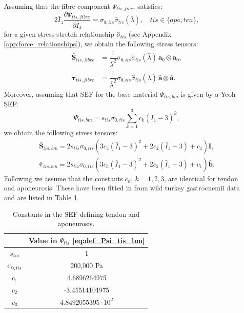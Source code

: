 \documentclass{sfuthesis}
\numberwithin{equation}{section}
\numberwithin{figure}{chapter}
\numberwithin{table}{chapter}
\theoremstyle{definition}
\def\*#1{{\mathbf{#1}}} %
\newcommand{\pder}[2]{\dfrac{\partial #1}{\partial #2}}
\newcommand{\I}{{\bar{I}}}
\def\btau{{\bm{\tau}}}
\begin{document}
Assuming that the fibre component $\Psi_{tis,fibre}$ satisfies:
\begin{equation}
    2 \I_4 \pder{\Psi_{tis,fibre}}{\I_4} = \sigma_{0,tis} \widehat{\sigma}_{tis}(\bar{\lambda}), \quad tis \in \{apo,ten\},
\end{equation}
for a given stress-stretch relationship $\widehat{\sigma}_{tis}$ (see Appendix \ref{app:force_relationships}), we obtain the following stress tensors:
\begin{align}
    \bar{\*S}_{tis,fibre} &= \dfrac{1}{\bar{\lambda}^2} \sigma_{0,tis} \widehat{\sigma}_{tis}(\bar{\lambda}) \, \*a_0 \otimes \*a_0, \\
    \bar{\btau}_{tis,fibre} &= \dfrac{1}{\bar{\lambda}^2} \sigma_{0,tis} \widehat{\sigma}_{tis}(\bar{\lambda}) \, \bar{\*a} \otimes \bar{\*a}.
\end{align}
Moreover, assuming that SEF for the base material $\Psi_{tis,bm}$ is given by a Yeoh SEF:
\begin{equation} \label{eq:def_Psi_tis_bm}
    \Psi_{tis,bm} = s_{tis} \sigma_{0,tis} \sum_{k=1}^3 c_k (\I_1 - 3)^k,
\end{equation}
we obtain the following stress tensors:
\begin{align}
    \bar{\*S}_{tis, bm} = 2 s_{tis} \sigma_{0,tis}  \left( 3c_3(\I_1-3)^2 + 2c_2 (\I_1-3) + c_1 \right) \*I, \\
    \bar{\btau}_{tis,bm} = 2 s_{tis} \sigma_{0,tis}  \left( 3c_3(\I_1-3)^2 + 2c_2 (\I_1-3) + c_1 \right) \bar{\*b}.
\end{align}
Following \cite{Seba} we assume that the constants $c_k$, $k=1,2,3$, are identical for tendon and aponeurosis. These have been fitted in \cite{Seba} from wild turkey gastrocnemii data \cite{Azizi2009} and are listed in Table \ref{tab:constants_ten_apo}.

\begin{table}
    \centering
    \begin{tabular}{|c|c|}\hline
        & Value in $\Psi_{tis}$ \eqref{eq:def_Psi_tis_bm} \\\hline
        $s_{tis}$ & 1 \\\hline
        $\sigma_{0,tis}$ & 200,000 \si{Pa} \\\hline
        $c_1$ & 4.6896264975 \\\hline
        $c_2$ & -3.45514101975 \\\hline
        $c_3$ & $4.8492055395 \cdot 10^2$ \\\hline
    \end{tabular}
    \caption{Constants in the SEF defining tendon and aponeurosis. \label{tab:constants_ten_apo}}
\end{table}
\end{document}
